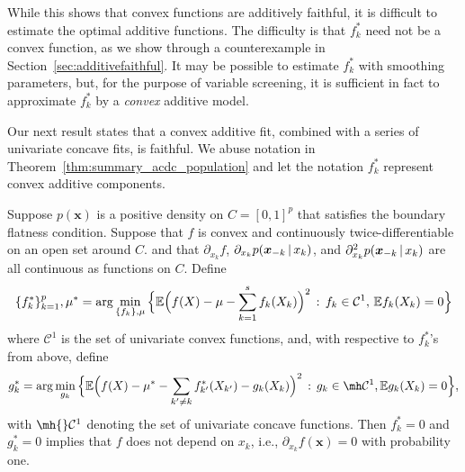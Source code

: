 While this shows that convex functions are additively faithful, it is difficult to
estimate the optimal additive functions.  The difficulty
is that $f^*_k$ need not be
a convex function, as we show through a counterexample
in Section~\ref{sec:additivefaithful}. It may be possible to estimate $f^*_k$ with smoothing parameters, but, for the purpose of variable screening, it is sufficient in fact to approximate $f^*_k$ by a \emph{convex} additive model. 

Our next result states that a convex additive fit, combined with a series of univariate concave fits, is faithful. We abuse notation in Theorem~\ref{thm:summary_acdc_population} and let the notation $f^*_k$ represent convex additive components.

\begin{stheorem}
\label{thm:summary_acdc_population}
Suppose $p(\mathbf{x})$ is a positive
density on $C=[0,1]^p$ that satisfies the boundary flatness
condition. Suppose that $f$ is convex and continuously twice-differentiable on an open set around $C$.
and that $\partial_{x_k} f$, $\partial_{x_k} p( \mbox{\boldmath $x$}_{-k}
{\,|\,} x_k )$, and $\partial_{x_k}^2 p( \mbox{\boldmath $x$}_{-k} {\,|\,} x_k)$
are all continuous as functions on $C$.
Define
\begin{equation}
\{ f^*_k \}_{k=1}^p,\mu^* = \arg\min_{\{f_k\},\mu} \Big \{
{\mathbb E}\Bigl( f(X) - \mu - \sum_{k=1}^s f_k(X_k) \Bigr)^2 \,:\, f_k \in
\mathcal{C}^1, \, {\mathbb E} f_k(X_k) = 0 \Big \}
\end{equation} where $\mathcal{C}^1$ is the set of univariate convex
functions, and, with respective to $f^*_k$'s from above, define
\begin{equation}
g^*_k = \arg\min_{g_k} \Big\{ \E\Bigl( f(X) - \mu^* - 
\sum_{k' \neq k} f^*_{k'}(X_{k'}) - g_k(X_k) \Bigr)^2 \,:\, g_k \in \mh
\mathcal{C}^1, \E g_k(X_k) = 0 \Big\},
\end{equation}
with $\mh{}\mathcal{C}^1$ denoting the set of univariate concave
functions.  Then $f^*_k = 0$ and $g^*_k = 0$ implies that $f$ does not
depend on $x_k$, i.e., $\partial_{x_k} f(\mathbf{x}) = 0$ with
probability one.
\end{stheorem}   

